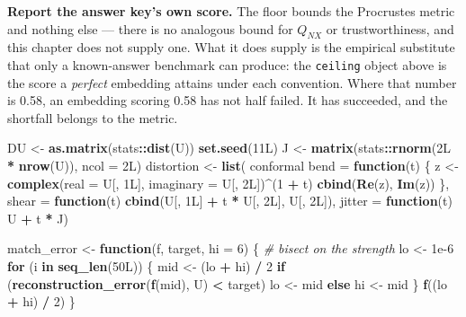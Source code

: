\documentclass[
  british,
  a4paper,
]{book}
\newenvironment{Shaded}{\begin{snugshade}}{\end{snugshade}}
\newcommand{\AttributeTok}[1]{\textcolor[rgb]{0.13,0.29,0.53}{#1}}
\newcommand{\CommentTok}[1]{\textcolor[rgb]{0.56,0.35,0.01}{\textit{#1}}}
\newcommand{\ControlFlowTok}[1]{\textcolor[rgb]{0.13,0.29,0.53}{\textbf{#1}}}
\newcommand{\DataTypeTok}[1]{\textcolor[rgb]{0.13,0.29,0.53}{#1}}
\newcommand{\DecValTok}[1]{\textcolor[rgb]{0.00,0.00,0.81}{#1}}
\newcommand{\FloatTok}[1]{\textcolor[rgb]{0.00,0.00,0.81}{#1}}
\newcommand{\FunctionTok}[1]{\textcolor[rgb]{0.13,0.29,0.53}{\textbf{#1}}}
\newcommand{\NormalTok}[1]{#1}
\newcommand{\OtherTok}[1]{\textcolor[rgb]{0.56,0.35,0.01}{#1}}
\newcommand{\SpecialCharTok}[1]{\textcolor[rgb]{0.81,0.36,0.00}{\textbf{#1}}}
\newcommand{\StringTok}[1]{\textcolor[rgb]{0.31,0.60,0.02}{#1}}
\begin{document}
\textbf{Report the answer key's own score.} The floor bounds the Procrustes metric
and nothing else --- there is no analogous bound for \(Q_{NX}\) or trustworthiness,
and this chapter does not supply one. What it does supply is the empirical
substitute that only a known-answer benchmark can produce: the \texttt{ceiling} object
above is the score a \emph{perfect} embedding attains under each convention. Where
that number is 0.58, an embedding scoring
0.58 has not half failed. It has succeeded, and the
shortfall belongs to the metric.

\begin{Shaded}
\begin{Highlighting}[]
\NormalTok{DU }\OtherTok{\textless{}{-}} \FunctionTok{as.matrix}\NormalTok{(stats}\SpecialCharTok{::}\FunctionTok{dist}\NormalTok{(U))}
\FunctionTok{set.seed}\NormalTok{(}\DecValTok{11}\DataTypeTok{L}\NormalTok{)}
\NormalTok{J }\OtherTok{\textless{}{-}} \FunctionTok{matrix}\NormalTok{(stats}\SpecialCharTok{::}\FunctionTok{rnorm}\NormalTok{(}\DecValTok{2}\DataTypeTok{L} \SpecialCharTok{*} \FunctionTok{nrow}\NormalTok{(U)), }\AttributeTok{ncol =} \DecValTok{2}\DataTypeTok{L}\NormalTok{)}
\NormalTok{distortion }\OtherTok{\textless{}{-}} \FunctionTok{list}\NormalTok{(}
  \StringTok{\textasciigrave{}}\AttributeTok{conformal bend}\StringTok{\textasciigrave{}} \OtherTok{=} \ControlFlowTok{function}\NormalTok{(t) \{}
\NormalTok{    z }\OtherTok{\textless{}{-}} \FunctionTok{complex}\NormalTok{(}\AttributeTok{real =}\NormalTok{ U[, }\DecValTok{1}\DataTypeTok{L}\NormalTok{], }\AttributeTok{imaginary =}\NormalTok{ U[, }\DecValTok{2}\DataTypeTok{L}\NormalTok{])}\SpecialCharTok{\^{}}\NormalTok{(}\DecValTok{1} \SpecialCharTok{+}\NormalTok{ t)}
    \FunctionTok{cbind}\NormalTok{(}\FunctionTok{Re}\NormalTok{(z), }\FunctionTok{Im}\NormalTok{(z))}
\NormalTok{  \},}
  \AttributeTok{shear  =} \ControlFlowTok{function}\NormalTok{(t) }\FunctionTok{cbind}\NormalTok{(U[, }\DecValTok{1}\DataTypeTok{L}\NormalTok{] }\SpecialCharTok{+}\NormalTok{ t }\SpecialCharTok{*}\NormalTok{ U[, }\DecValTok{2}\DataTypeTok{L}\NormalTok{], U[, }\DecValTok{2}\DataTypeTok{L}\NormalTok{]),}
  \AttributeTok{jitter =} \ControlFlowTok{function}\NormalTok{(t) U }\SpecialCharTok{+}\NormalTok{ t }\SpecialCharTok{*}\NormalTok{ J)}

\NormalTok{match\_error }\OtherTok{\textless{}{-}} \ControlFlowTok{function}\NormalTok{(f, target, }\AttributeTok{hi =} \DecValTok{6}\NormalTok{) \{          }\CommentTok{\# bisect on the strength}
\NormalTok{  lo }\OtherTok{\textless{}{-}} \FloatTok{1e{-}6}
  \ControlFlowTok{for}\NormalTok{ (i }\ControlFlowTok{in} \FunctionTok{seq\_len}\NormalTok{(}\DecValTok{50}\DataTypeTok{L}\NormalTok{)) \{}
\NormalTok{    mid }\OtherTok{\textless{}{-}}\NormalTok{ (lo }\SpecialCharTok{+}\NormalTok{ hi) }\SpecialCharTok{/} \DecValTok{2}
    \ControlFlowTok{if}\NormalTok{ (}\FunctionTok{reconstruction\_error}\NormalTok{(}\FunctionTok{f}\NormalTok{(mid), U) }\SpecialCharTok{\textless{}}\NormalTok{ target) lo }\OtherTok{\textless{}{-}}\NormalTok{ mid }\ControlFlowTok{else}\NormalTok{ hi }\OtherTok{\textless{}{-}}\NormalTok{ mid}
\NormalTok{  \}}
  \FunctionTok{f}\NormalTok{((lo }\SpecialCharTok{+}\NormalTok{ hi) }\SpecialCharTok{/} \DecValTok{2}\NormalTok{)}
\NormalTok{\}}


\end{Highlighting}
\end{Shaded}
\end{document}
